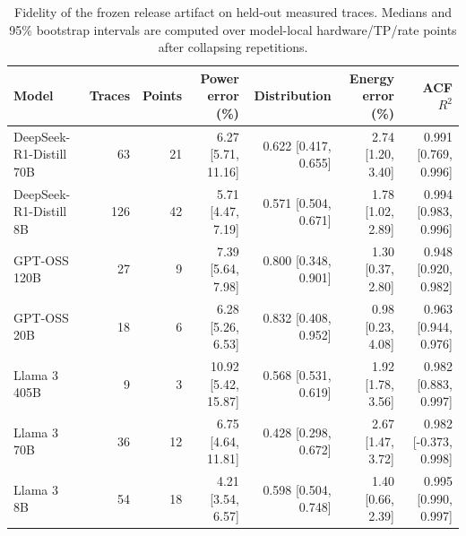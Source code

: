 \begin{table}[t]
\centering
\small
\caption{Fidelity of the frozen release artifact on held-out measured traces. Medians and 95\% bootstrap intervals are computed over model-local hardware/TP/rate points after collapsing repetitions.}
\label{tab:selected-model-fidelity}
\begin{tabular}{lrrrrrr}
\toprule
Model & Traces & Points & Power error (\%) & Distribution & Energy error (\%) & ACF $R^2$ \\
\midrule
DeepSeek-R1-Distill 70B & 63 & 21 & 6.27 [5.71, 11.16] & 0.622 [0.417, 0.655] & 2.74 [1.20, 3.40] & 0.991 [0.769, 0.996] \\
DeepSeek-R1-Distill 8B & 126 & 42 & 5.71 [4.47, 7.19] & 0.571 [0.504, 0.671] & 1.78 [1.02, 2.89] & 0.994 [0.983, 0.996] \\
GPT-OSS 120B & 27 & 9 & 7.39 [5.64, 7.98] & 0.800 [0.348, 0.901] & 1.30 [0.37, 2.80] & 0.948 [0.920, 0.982] \\
GPT-OSS 20B & 18 & 6 & 6.28 [5.26, 6.53] & 0.832 [0.408, 0.952] & 0.98 [0.23, 4.08] & 0.963 [0.944, 0.976] \\
Llama 3 405B & 9 & 3 & 10.92 [5.42, 15.87] & 0.568 [0.531, 0.619] & 1.92 [1.78, 3.56] & 0.982 [0.883, 0.997] \\
Llama 3 70B & 36 & 12 & 6.75 [4.64, 11.81] & 0.428 [0.298, 0.672] & 2.67 [1.47, 3.72] & 0.982 [-0.373, 0.998] \\
Llama 3 8B & 54 & 18 & 4.21 [3.54, 6.57] & 0.598 [0.504, 0.748] & 1.40 [0.66, 2.39] & 0.995 [0.990, 0.997] \\
\bottomrule
\end{tabular}
\end{table}
